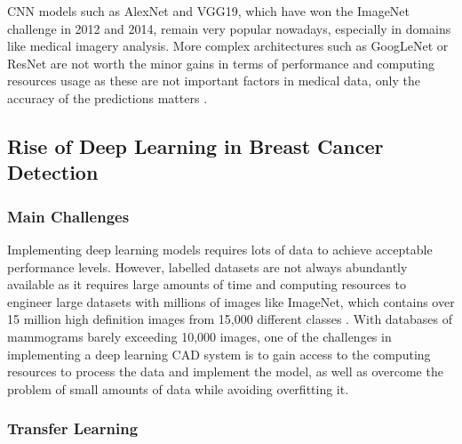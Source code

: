 CNN models such as AlexNet and VGG19, which have won the ImageNet challenge in 2012 and 2014, remain very popular nowadays, especially in domains like medical imagery analysis. More complex architectures such as GoogLeNet or ResNet are not worth the minor gains in terms of performance and computing resources usage as these are not important factors in medical data, only the accuracy of the predictions matters \citep{Litjens2017}.



\subsection{Rise of Deep Learning in Breast Cancer Detection}

\subsubsection{Main Challenges}

Implementing deep learning models requires lots of data to achieve acceptable performance levels. However, labelled datasets are not always abundantly available as it requires large amounts of time and computing resources to engineer large datasets with millions of images \citep{Krizhevsky2012} like ImageNet, which contains over 15 million high definition images from 15,000 different classes \citep{Deng2010}. With databases of mammograms barely exceeding 10,000 images, one of the challenges in implementing a deep learning CAD system is to gain access to the computing resources to process the data and implement the model, as well as overcome the problem of small amounts of data while avoiding overfitting it.

\subsubsection{Transfer Learning}

